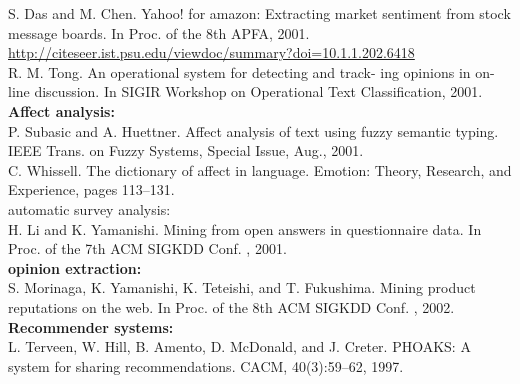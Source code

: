 \documentclass[9pt]{article}
\begin{document}
S. Das and M. Chen.   Yahoo! for amazon: Extracting market sentiment from stock message boards. In Proc. of the 8th APFA, 2001. \url{http://citeseer.ist.psu.edu/viewdoc/summary?doi=10.1.1.202.6418}\\
R. M. Tong.  An operational system for detecting and track-
ing opinions in on-line discussion.   In SIGIR Workshop on Operational Text Classification, 2001.\\
\textbf{Affect analysis:} \\
P. Subasic  and  A.  Huettner.   Affect  analysis  of  text  using fuzzy semantic typing. IEEE Trans. on Fuzzy Systems, Special Issue, Aug., 2001.\\
C. Whissell.  The dictionary of affect in language. Emotion: Theory, Research, and Experience, pages 113–131.\\
automatic survey analysis:\\
H. Li and K. Yamanishi. Mining from open answers in questionnaire data. In Proc. of the 7th ACM SIGKDD Conf. , 2001.\\
\textbf{opinion extraction: }\\
S. Morinaga, K. Yamanishi, K. Teteishi, and T. Fukushima. Mining product reputations on the web.  In Proc. of the 8th ACM SIGKDD Conf. , 2002.\\
\textbf{Recommender systems: }\\
L. Terveen, W. Hill, B. Amento, D. McDonald, and J. Creter. PHOAKS: A system for sharing recommendations. CACM, 40(3):59–62, 1997.\\
\end{document}
